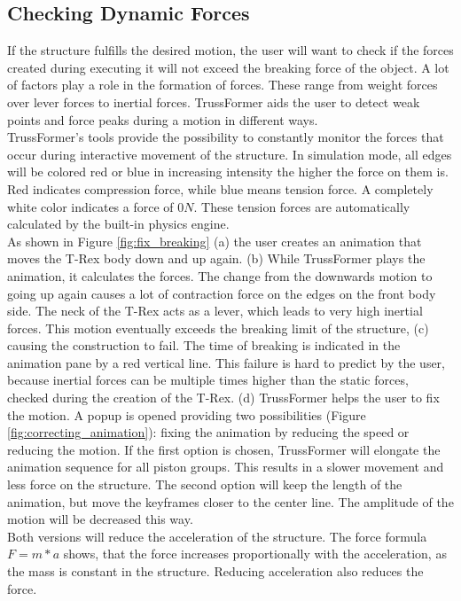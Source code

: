 \subsection{Checking Dynamic Forces}
If the structure fulfills the desired motion, the user will want to check if the forces created during executing it will not exceed the breaking force of the object. A lot of factors play a role in the formation of forces. These range from weight forces over lever forces to inertial forces. TrussFormer aids the user to detect weak points and force peaks during a motion in different ways.\\
TrussFormer's tools provide the possibility to constantly monitor the forces that occur during interactive movement of the structure. In simulation mode, all edges will be colored red or blue in increasing intensity the higher the force on them is. Red indicates compression force, while blue means tension force. A completely white color indicates a force of $0 N$. These tension forces are automatically calculated by the built-in physics engine.\\
As shown in Figure \ref{fig:fix_breaking} (a) the user creates an animation that moves the T-Rex body down and up again. (b) While TrussFormer plays the animation, it calculates the forces. The change from the downwards motion to going up again causes a lot of contraction force on the edges on the front body side. The neck of the T-Rex acts as a lever, which leads to very high inertial forces. This motion eventually exceeds the breaking limit of the structure, (c) causing the construction to fail. The time of breaking is indicated in the animation pane by a red vertical line. This failure is hard to predict by the user, because inertial forces can be multiple times higher than the static forces, checked during the creation of the T-Rex. (d) TrussFormer helps the user to fix the motion. A popup is opened providing two possibilities (Figure \ref{fig:correcting_animation}): fixing the animation by reducing the speed or reducing the motion. If the first option is chosen, TrussFormer will elongate the animation sequence for all piston groups. This results in a slower movement and less force on the structure. The second option will keep the length of the animation, but move the keyframes closer to the center line. The amplitude of the motion will be decreased this way.\\
Both versions will reduce the acceleration of the structure. The force formula $F = m * a$ shows, that the force increases proportionally with the acceleration, as the mass is constant in the structure. Reducing acceleration also reduces the force.
